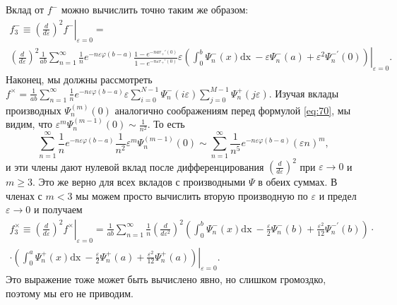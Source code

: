 \documentclass{article}
\newcommand{\dx}{\mathrm{dx}~}
\begin{document}
Вклад от $f^{-}$ можно вычислить точно таким же образом:
\begin{multline}
  \label{eq:72}
   f^{-}_{3}\equiv \left.\left(\frac{d}{d\varepsilon}\right)^{2} f^{-}\right|_{\varepsilon=0} =\\
  \left.\left(\frac{d}{d\varepsilon}\right)^{2}\frac{1}{ab}\sum_{n=1}^{\infty} \frac{1}{n}
  e^{-n\varepsilon\varphi(b-a)} \frac{1-e^{-nar_{+}'(0)}}{1-e^{-n\varepsilon r_{+}'(0)}}
 \varepsilon\left(\int_{0}^{b} \Psi_{n}^{-}(x) \dx -\varepsilon \Psi_{n}^{-}(a) +\varepsilon^{2}\Psi^{-'}_{n}(0)\right)\right|_{\varepsilon=0}.
\end{multline}
Наконец, мы должны рассмотреть
$f^{\times}=\frac{1}{ab}\sum_{n=1}^{\infty}\frac{1}{n}e^{-n\varepsilon\varphi(b-a)}\varepsilon\sum_{i=0}^{N-1}\Psi_{n}^{-}(i\varepsilon)
\sum_{j=0}^{M-1}\Psi_{n}^{+}(j\varepsilon)$. Изучая вклады производных
$\Psi_{n}^{(m)}(0)$ аналогично соображениям перед формулой \eqref{eq:70}, мы видим, что
$\varepsilon^{m}\Psi_{n}^{(m-1)}(0)\sim \frac{1}{n^{2}}$. То есть
\[\sum_{n=1}^{\infty}\frac{1}{n}e^{-n\varepsilon\varphi(b-a)}\frac{1}{n^{2}}\varepsilon^{m}\Psi_{n}^{(m-1)}(0)\sim
\sum_{n=1}^{\infty}\frac{1}{n^{5}}e^{-n\varepsilon\varphi(b-a)}(\varepsilon n)^{m},\] и эти члены
дают нулевой вклад после дифференцирования  $\left(\frac{d}{d\varepsilon}\right)^{2}$ при
$\varepsilon\to 0 $ и $m\geq 3$. Это же верно для всех вкладов с производными 
$\Psi$ в обеих суммах. В членах с  $m<3$ мы можем просто вычислить вторую производную по
$\varepsilon$ и предел $\varepsilon\to 0$ и получаем
\begin{multline}
  \label{eq:73}
   f^{\times}_{3}\equiv \left.\left(\frac{d}{d\varepsilon}\right)^{2}
    f^{\times}\right|_{\varepsilon=0}=\left.\frac{1}{ab}\sum_{n=1}^{\infty}\frac{1}{n}
  \left(\frac{d}{d\varepsilon^{2}}\right)^{2}\left(\int_{0}^{b}\Psi^{-}_{n}(x)\dx
    -\frac{\varepsilon}{2}\Psi^{-}_{n}(b)+\frac{\varepsilon^{2}}{12}\Psi^{-'}_{n}(b)\right)\cdot\right.\\
\cdot\left.\left(\int_{0}^{a}\Psi^{+}_{n}(x)\dx-\frac{\varepsilon}{2}\Psi^{+}_{n}(a)+
    \frac{\varepsilon^{2}}{12}\Psi^{+}_{n}(a)\right)\right|_{\varepsilon=0}.
\end{multline}
Это выражение тоже может быть вычислено явно, но слишком громоздко, поэтому мы его не приводим. 
\end{document}
